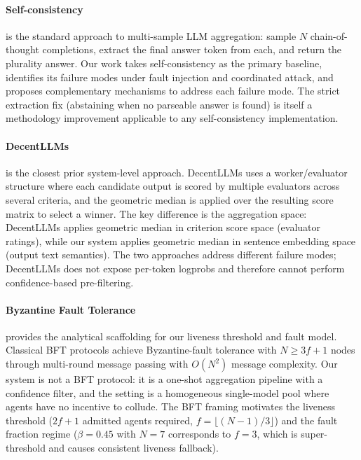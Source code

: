 \documentclass[11pt]{article}
\begin{document}
\paragraph{Self-consistency \citep{wang2023self}}
is the standard approach to multi-sample LLM aggregation: sample $N$
chain-of-thought completions, extract the final answer token from each, and
return the plurality answer. Our work takes self-consistency as the primary
baseline, identifies its failure modes under fault injection and coordinated
attack, and proposes complementary mechanisms to address each failure mode. The
strict extraction fix (abstaining when no parseable answer is found) is itself a
methodology improvement applicable to any self-consistency implementation.

\paragraph{DecentLLMs \citep{jo2024decentllms}}
is the closest prior system-level approach. DecentLLMs uses a worker/evaluator
structure where each candidate output is scored by multiple evaluators across
several criteria, and the geometric median is applied over the resulting score
matrix to select a winner. The key difference is the aggregation space:
DecentLLMs applies geometric median in criterion score space (evaluator ratings),
while our system applies geometric median in sentence embedding space (output
text semantics). The two approaches address different failure modes; DecentLLMs
does not expose per-token logprobs and therefore cannot perform
confidence-based pre-filtering.

\paragraph{Byzantine Fault Tolerance \citep{lamport1982byzantine,castro1999practical}}
provides the analytical scaffolding for our liveness threshold and fault model.
Classical BFT protocols achieve Byzantine-fault tolerance with $N \geq 3f+1$
nodes through multi-round message passing with $O(N^2)$ message complexity. Our
system is not a BFT protocol: it is a one-shot aggregation pipeline with a
confidence filter, and the setting is a homogeneous single-model pool where
agents have no incentive to collude. The BFT framing motivates the liveness
threshold ($2f+1$ admitted agents required, $f = \lfloor(N-1)/3\rfloor$) and the
fault fraction regime ($\beta=0.45$ with $N=7$ corresponds to $f=3$, which is
super-threshold and causes consistent liveness fallback).
\end{document}
